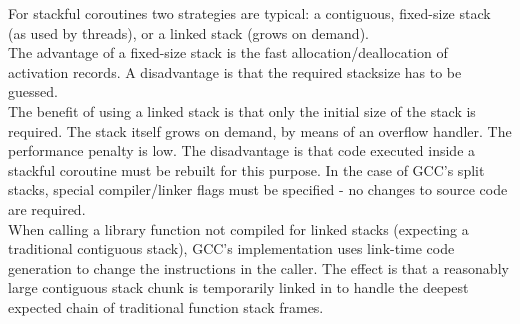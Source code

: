 For stackful coroutines two strategies are typical: a contiguous, fixed-size
stack (as used by threads), or a linked stack (grows on demand).\\
The advantage of a fixed-size stack is the fast allocation/deallocation of 
activation records. A disadvantage is that the required stacksize has to
be guessed.\\
The benefit of using a linked stack is that only the initial size of the stack
is required. The stack itself grows on demand, by means of an overflow handler.
The performance penalty is low. The disadvantage is that
code executed inside a stackful coroutine must be rebuilt for this
purpose. In the case of GCC's split stacks, special compiler/linker flags must
be specified - no changes to source code are required.\\
When calling a library function not compiled for linked stacks (expecting a
traditional contiguous stack), GCC's implementation uses link-time code
generation to change the instructions in the caller. The effect is that a
reasonably large contiguous stack chunk is temporarily linked in to handle the
deepest expected chain of traditional function stack frames.
